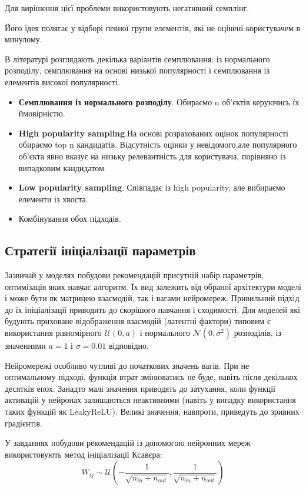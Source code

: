 Для вирішення цієї проблеми використовують негативний семплінг. 

Його ідея полягає у відборі певної групи елементів, які не оцінені користувачем в минулому. 

В літературі розглядають декілька варіантів семплювання: із нормального розподілу, семплювання на основі низької популярності і семплювання із елементів високої популярності.

\begin{itemize}
    \item \textbf{Семплювання із нормального розподілу}. Обираємо n об’єктів керуючись їх ймовірністю.
    \item \textbf{High popularity sampling}.На основі розрахованих оцінок популярності обираємо top n кандидатів. Відсутність оцінки у невідомого,але популярного об’єкта явно вказує на низьку релевантність для користувача, порівняно із випадковим кандидатом.
    \item \textbf{Low popularity sampling}. Співпадає із high popularity, але вибираємо елементи із хвоста.
    \item Комбінування обох підходів.
\end{itemize}

\subsection{Стратегії ініціалізації параметрів}

Зазвичай у моделях побудови рекомендацій присутній набір параметрів, оптимізація яких навчає алгоритм. Їх вид залежить від обраної архітектури моделі і може бути як матрицею взаємодій, так і вагами нейромереж.
Привильний підхід до їх ініціалізації приводить до скорішого навчання і сходимості. Для моделей які будують приховане відображення взаємодій (латентні фактори) типовим є використання рівномірного $\mathcal{U}(0, a)$ і нормального $\mathcal{N}(0, \sigma^{2})$ розподілів, із значеннями $a = 1$ і $\sigma = 0.01$ відповідно.

Нейромережі особливо чутливі до початкових значень вагів. При не оптимальному підході, функція втрат змінюватись не буде, навіть після декількох десятків епох. Занадто малі значення приводять до затухання, коли функції активацій у нейронах залишаються неактивними (навіть у випадку використання таких функцій як LeakyReLU). Великі значення, навпроти, приведуть до зривних градієнтів.

У завданнях побудови рекомендацій із допомогою нейронних мереж використовують метод ініціалізації Ксавєра:
\[ W_{ij} \sim \mathcal{U}(- \frac{1}{\sqrt{n_{in} + n_{out}}}, \frac{1}{\sqrt{n_{in} + n_{out}}}) \]

